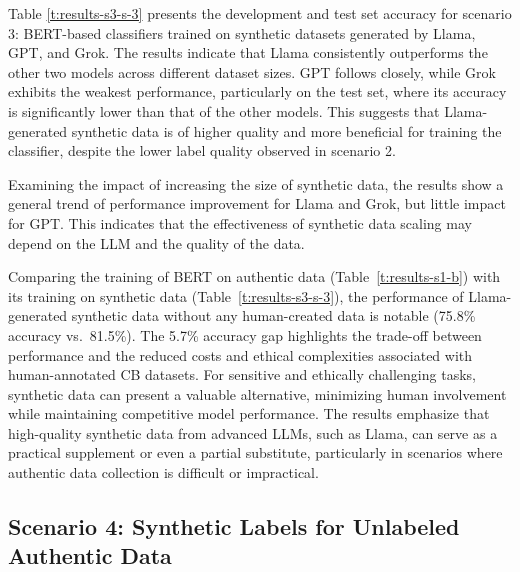 
%

Table \ref{t:results-s3-s-3} presents the development and test set accuracy for scenario 3: BERT-based classifiers trained on synthetic datasets generated by Llama, GPT, and Grok. The results indicate that Llama consistently outperforms the other two models across different dataset sizes. GPT follows closely, while Grok exhibits the weakest performance, particularly on the test set, where its accuracy is significantly lower than that of the other models. This suggests that Llama-generated synthetic data is of higher quality and more beneficial for training the classifier, despite the lower label quality observed in scenario 2.

Examining the impact of increasing the size of synthetic data, the results show a general trend of performance improvement for Llama and Grok, but little impact for GPT.
This indicates that the effectiveness of synthetic data scaling may depend on the LLM and the quality of the data.

Comparing the training of BERT on authentic data (Table~\ref{t:results-s1-b}) with its training on synthetic data (Table~\ref{t:results-s3-s-3}), the performance of Llama-generated synthetic data without any human-created data is notable  (75.8\% accuracy vs.\ 81.5\%).
The 5.7\% accuracy gap highlights the trade-off between performance and the reduced costs and ethical complexities associated with human-annotated CB datasets.
For sensitive and ethically challenging tasks, %
synthetic data can present a valuable alternative, minimizing human involvement while maintaining competitive model performance.
The results emphasize that high-quality synthetic data from advanced LLMs, such as Llama, can serve as a practical supplement or even a partial substitute, particularly in scenarios where authentic data collection is difficult or impractical.

\subsection{Scenario 4: Synthetic Labels for Unlabeled Authentic Data}

